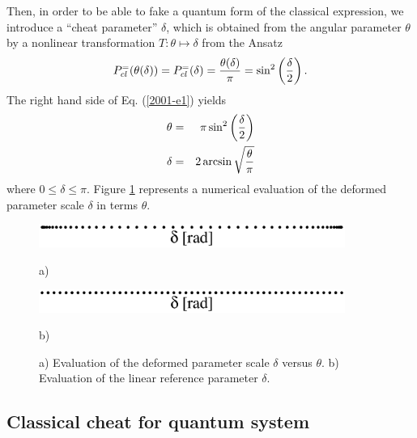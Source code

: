 Then, in order to be able to fake
a quantum form of the classical expression,
we introduce a ``cheat parameter'' $\delta $,
which is obtained from the angular parameter $\theta $
by a nonlinear transformation
$T:\theta \mapsto \delta$
from the Ansatz
\begin{equation}
P^{=}_{cl}(\theta (\delta ))
  =
P^{=}_{cl}(\delta )
=
{\theta (\delta )\over \pi}=
\sin^2 \left({\delta \over 2}\right)
.
\label{2001-e1}
\end{equation}
The right hand side of Eq. (\ref{2001-e1})
yields
\begin{eqnarray}
\theta &=& \pi \sin^2 \left({\delta \over 2} \right)\\
\delta &=& 2\arcsin \sqrt{{\theta \over \pi}}
\end{eqnarray}
where $0\le \delta  \le \pi$.
Figure   \ref{2001-cheat-f1} represents a numerical evaluation
of the deformed parameter scale $\delta$ in terms $\theta$.
\begin{figure}
\begin{center}
 \includegraphics[width=10cm]{2001-cesena-f4a.eps}
\end{center}
\begin{center}a)\end{center}
\begin{center}
 \includegraphics[width=10cm]{2001-cesena-f4b.eps}
\end{center}
\begin{center}b)\end{center}
 \caption{
a) Evaluation of the deformed parameter scale $\delta$ versus $\theta$.
b) Evaluation of the linear reference parameter $\delta$.
}
\label{2001-cheat-f1}
\end{figure}






\subsection{Classical cheat for quantum system}

